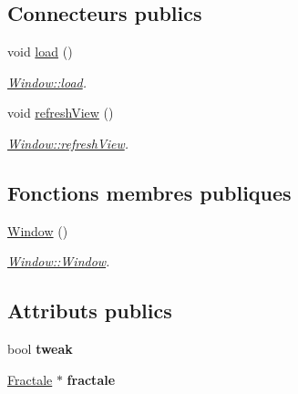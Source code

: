 \subsection*{Connecteurs publics}
\begin{DoxyCompactItemize}
\item 
\hypertarget{class_window_a0c61ace2c0af9829fc1c66f96edf64be}{}void \hyperlink{class_window_a0c61ace2c0af9829fc1c66f96edf64be}{load} ()\label{class_window_a0c61ace2c0af9829fc1c66f96edf64be}

\begin{DoxyCompactList}\small\item\em \hyperlink{class_window_a0c61ace2c0af9829fc1c66f96edf64be}{Window\+::load}. \end{DoxyCompactList}\item 
\hypertarget{class_window_ab2babfe1d3ae399e069000309cc3a7ae}{}void \hyperlink{class_window_ab2babfe1d3ae399e069000309cc3a7ae}{refresh\+View} ()\label{class_window_ab2babfe1d3ae399e069000309cc3a7ae}

\begin{DoxyCompactList}\small\item\em \hyperlink{class_window_ab2babfe1d3ae399e069000309cc3a7ae}{Window\+::refresh\+View}. \end{DoxyCompactList}\end{DoxyCompactItemize}
\subsection*{Fonctions membres publiques}
\begin{DoxyCompactItemize}
\item 
\hypertarget{class_window_a74e6087da23d3c24e9fac0245e5ec92c}{}\hyperlink{class_window_a74e6087da23d3c24e9fac0245e5ec92c}{Window} ()\label{class_window_a74e6087da23d3c24e9fac0245e5ec92c}

\begin{DoxyCompactList}\small\item\em \hyperlink{class_window_a74e6087da23d3c24e9fac0245e5ec92c}{Window\+::\+Window}. \end{DoxyCompactList}\end{DoxyCompactItemize}
\subsection*{Attributs publics}
\begin{DoxyCompactItemize}
\item 
\hypertarget{class_window_a52e7d4e63f98e761696b4e5e0296c053}{}bool {\bfseries tweak}\label{class_window_a52e7d4e63f98e761696b4e5e0296c053}

\item 
\hypertarget{class_window_a022688408d51ba601784ebfef3f8da10}{}\hyperlink{class_fractale}{Fractale} $\ast$ {\bfseries fractale}\label{class_window_a022688408d51ba601784ebfef3f8da10}

\end{DoxyCompactItemize}
